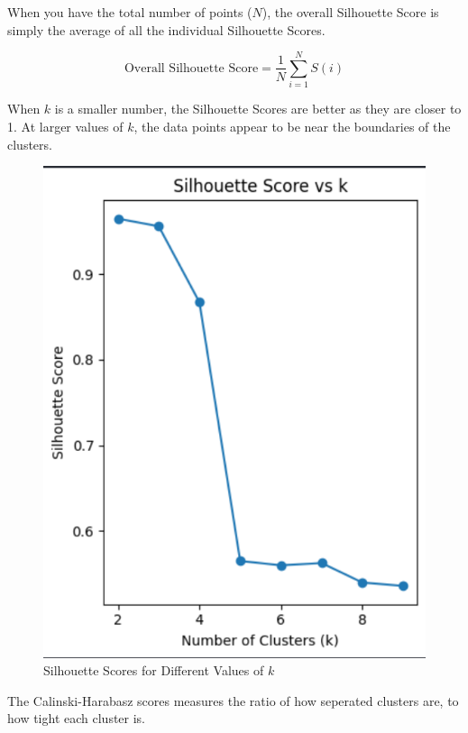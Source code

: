 \documentclass[conference]{IEEEtran}
\begin{document}
\[ \]

When you have the total number of points (\(N\)), the overall Silhouette Score is simply the average of all the individual Silhouette Scores.

\begin{equation}
\text{Overall Silhouette Score} = \frac{1}{N} \sum_{i=1}^{N} S(i)
\end{equation}

        When \(k\) is a smaller number, the Silhouette Scores are better as
they are closer to 1. At larger values of \(k\), the data points appear to be
near the boundaries of the clusters.

\begin{figure}[htbp]
    \centering
    \includegraphics[width=\columnwidth]{silhouette_score.png}
    \caption{Silhouette Scores for Different Values of \(k\)}
    \label{fig:example}
\end{figure}

The Calinski-Harabasz scores measures the ratio of how seperated clusters are, to how tight each cluster is.
\end{document}
